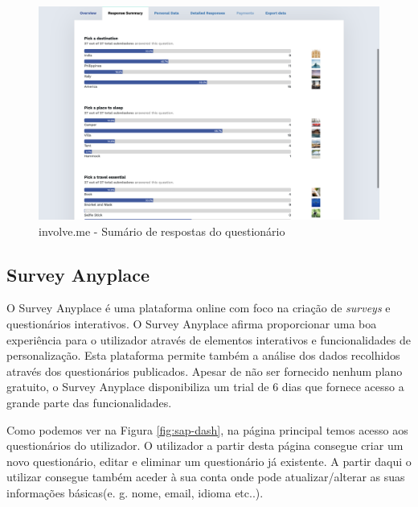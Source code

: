 \begin{figure}[ht!]
	\begin{center}
		\includegraphics[width=1\textwidth]{img/ivme/results1}
		\caption{involve.me - Sumário de respostas do questionário}
		\label{fig:ivme-results1}
	\end{center}
\end{figure}


\subsection{Survey Anyplace}
\label{surveyanyplaceM}



O Survey Anyplace é uma plataforma online com foco na criação de \textit{surveys} e questionários interativos. O Survey Anyplace afirma proporcionar uma boa experiência para o utilizador através de elementos interativos e funcionalidades de personalização. Esta plataforma permite também a análise dos dados recolhidos através dos questionários publicados. Apesar de não ser fornecido nenhum plano gratuito, o Survey Anyplace disponibiliza um trial de 6 dias que fornece acesso a grande parte das funcionalidades.

Como podemos ver na Figura \ref{fig:sap-dash}, na página principal temos acesso aos questionários do utilizador. O utilizador a partir desta página consegue criar um novo questionário, editar e eliminar um questionário já existente. A partir daqui o utilizar consegue também aceder à sua conta onde pode atualizar/alterar as suas informações básicas(e. g. nome, email, idioma etc..). 


